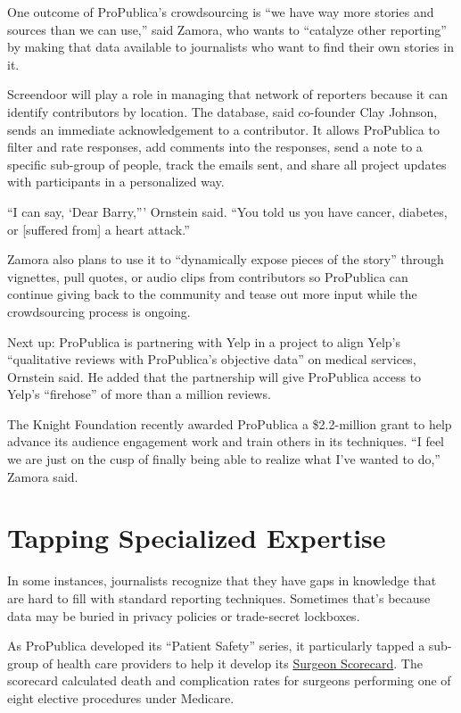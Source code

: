 \documentclass[notoc, symmetric, nobib, nols]{towcenter-guideto-book}
\begin{document}
One outcome of ProPublica's crowdsourcing is ``we have way more stories and sources than we can use,'' said Zamora, who wants to ``catalyze other reporting'' by making that data available to journalists who want to find their own stories in it.

Screendoor will play a role in managing that network of reporters because it can identify contributors by location. The database, said co-founder Clay Johnson, sends an immediate acknowledgement to a contributor. It allows ProPublica to filter and rate responses, add comments into the responses, send a note to a specific sub-group of people, track the emails sent, and share all project updates with participants in a personalized way. 

``I can say, ‘Dear Barry,''' Ornstein said. ``You told us you have cancer, diabetes, or [suffered from] a heart attack.''

Zamora also plans to use it to ``dynamically expose pieces of the story'' through vignettes, pull quotes, or audio clips from contributors so ProPublica can continue giving back to the community and tease out more input while the crowdsourcing process is ongoing.%

Next up: ProPublica is partnering with Yelp in a project to align Yelp's ``qualitative reviews with ProPublica's objective data'' on medical services, Ornstein said. He added that the partnership will give ProPublica access to Yelp's ``firehose'' of more than a million reviews.%

The Knight Foundation recently awarded ProPublica a \$2.2-million grant to help advance its audience engagement work and train others in its techniques. ``I feel we are just on the cusp of finally being able to realize what I've wanted to do,'' Zamora said.


\section{ Tapping Specialized Expertise}

In some instances, journalists recognize that they have gaps in knowledge that are hard to fill with standard reporting techniques. Sometimes that's because data may be buried in privacy policies or trade-secret lockboxes. 

As ProPublica developed its ``Patient Safety'' series, it particularly tapped a sub-group of health care providers to help it develop its \href{https://projects.propublica.org/surgeons/}{Surgeon Scorecard}.\autocite{scorecard} The scorecard calculated death and complication rates for surgeons performing one of eight elective procedures under Medicare.
\end{document}

